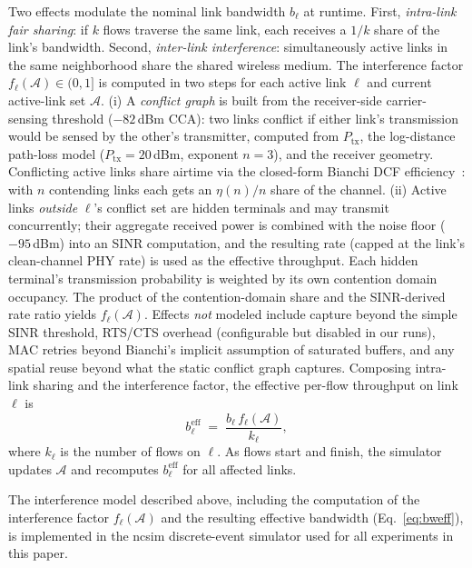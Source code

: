 \documentclass[conference]{IEEEtran}
\begin{document}
Two effects modulate the nominal link bandwidth $b_\ell$ at runtime. First,
\emph{intra-link fair sharing}: if $k$ flows traverse the same link, each
receives a $1/k$ share of the link's bandwidth. Second, \emph{inter-link
interference}: simultaneously active links in the same neighborhood share
the shared wireless medium. The interference factor
$f_\ell(\mathcal{A})\in(0,1]$ is computed in two steps for each active
link $\ell$ and current active-link set $\mathcal{A}$. (i) A
\emph{conflict graph} is built from the receiver-side carrier-sensing
threshold ($-82$\,dBm CCA): two links conflict if either link's
transmission would be sensed by the other's transmitter, computed from
$P_{\text{tx}}$, the log-distance path-loss model
($P_{\text{tx}}=20$\,dBm, exponent $n=3$), and the receiver geometry.
Conflicting active links share airtime via the closed-form Bianchi DCF
efficiency~\cite{bianchi2000performance}: with $n$ contending links each
gets an $\eta(n)/n$ share of the channel. (ii) Active links \emph{outside}
$\ell$'s conflict set are hidden terminals and may transmit concurrently;
their aggregate received power is combined with the noise floor
($-95$\,dBm) into an SINR computation, and the resulting rate (capped at
the link's clean-channel PHY rate) is used as the effective throughput.
Each hidden terminal's transmission probability is weighted by its own
contention domain occupancy. The product of the contention-domain share
and the SINR-derived rate ratio yields $f_\ell(\mathcal{A})$. Effects
\emph{not} modeled include capture beyond the simple SINR threshold,
RTS/CTS overhead (configurable but disabled in our runs), MAC retries
beyond Bianchi's implicit assumption of saturated buffers, and any
spatial reuse beyond what the static conflict graph captures. Composing
intra-link sharing and the interference factor, the effective per-flow
throughput on link $\ell$ is
\begin{equation}
b_\ell^{\text{eff}}
\;=\;\frac{b_\ell\,f_\ell(\mathcal{A})}{k_\ell},
\label{eq:bweff}
\end{equation}
where $k_\ell$ is the number of flows on $\ell$. As flows start and finish,
the simulator updates $\mathcal{A}$ and recomputes $b_\ell^{\text{eff}}$ for
all affected links.

The interference model described above, including the computation of the
interference factor $f_\ell(\mathcal{A})$ and the resulting effective
bandwidth (Eq.~\eqref{eq:bweff}), is implemented in the ncsim discrete-event
simulator used for all experiments in this paper.
\end{document}
